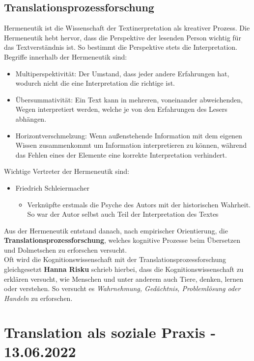 \documentclass{article}
\begin{document}
	\subsection{Translationsprozessforschung}
	Hermeneutik ist die Wissenschaft der Textinerpretation als kreativer Prozess. Die Hermeneutik hebt hervor, dass die Perspektive der lesenden Person wichtig für das Textverständnis ist. So bestimmt die Perspektive stets die Interpretation. \\
	Begriffe innerhalb der Hermeneutik sind:
	\begin{itemize}
		\item{Multiperspektivität: Der Umstand, dass jeder andere Erfahrungen hat, wodurch nicht die eine Interpretation die richtige ist.}
		\item{Übersummativität: Ein Text kann in mehreren, voneinander abweichenden, Wegen interpretiert werden, welche je von den Erfahrungen des Lesers abhängen.}
		\item{Horizontverschmelzung: Wenn außenstehende Information mit dem eigenen Wissen zusammenkommt um Information interpretieren zu können, während das Fehlen eines der Elemente eine korrekte Interpretation verhindert.}
	\end{itemize}
	Wichtige Vertreter der Hermeneutik sind:
	\begin{itemize}
		\item{Friedrich Schleiermacher}
		\begin{itemize}
			\item{Verknüpfte erstmals die Psyche des Autors mit der historischen Wahrheit. So war der Autor selbst auch Teil der Interpretation des Textes}
		\end{itemize}
	\end{itemize}
	Aus der Hermeneutik entstand danach, nach empirischer Orientierung, die \textbf{Translationsprozessforschung}, welches kognitive Prozesse beim Übersetzen und Dolmetschen zu erforschen versucht. \\
	Oft wird die Kognitionswissenschaft mit der Translationsprozessforschung gleichgesetzt
	\textbf{Hanna Risku} schrieb hierbei, dass die Kognitionswissenschaft zu erklären versucht, wie Menschen und unter anderem auch Tiere, denken, lernen oder verstehen. So versucht es \textit{Wahrnehmung, Gedächtnis, Problemlösung oder Handeln} zu erforschen.

	\section{Translation als soziale Praxis - 13.06.2022}
\end{document}
